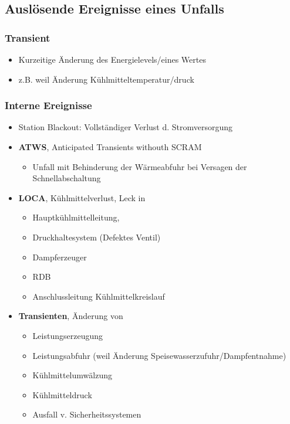 \documentclass[12pt]{article}
\begin{document}
\subsection{Auslösende Ereignisse eines Unfalls}

\subsubsection{Transient}
\begin{itemize}
  \item Kurzeitige Änderung des Energielevels/eines Wertes
  \item z.B. weil Änderung Kühlmitteltemperatur/druck
\end{itemize}

\subsubsection{Interne Ereignisse}
\begin{itemize}
  \item Station Blackout: Vollständiger Verlust d. Stromversorgung
  \item \textbf{ATWS}, Anticipated Transients withouth SCRAM
  \begin{itemize}
    \item Unfall mit Behinderung der Wärmeabfuhr bei Versagen der Schnellabschaltung
  \end{itemize}
  \item \textbf{LOCA}, Kühlmittelverlust, Leck in
  \begin{itemize}
    \item Hauptkühlmittelleitung,
    \item Druckhaltesystem (Defektes Ventil)
    \item Dampferzeuger
    \item RDB
    \item Anschlussleitung Kühlmittelkreislauf
  \end{itemize}
  \item \textbf{Transienten}, Änderung von
  \begin{itemize}
    \item Leistungserzeugung
    \item Leistungsabfuhr (weil Änderung Speisewasserzufuhr/Dampfentnahme)
    \item Kühlmittelumwälzung
    \item Kühlmitteldruck
    \item Ausfall v. Sicherheitssystemen
  \end{itemize}
\end{itemize}
\end{document}
